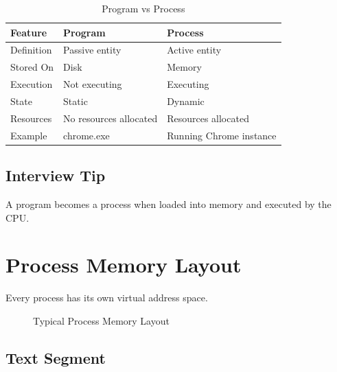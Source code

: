 \begin{table}[H]
\centering
\begin{tabular}{|p{4cm}|p{5.5cm}|p{5.5cm}|}
\hline
Feature & Program & Process \\
\hline
Definition & Passive entity & Active entity \\
\hline
Stored On & Disk & Memory \\
\hline
Execution & Not executing & Executing \\
\hline
State & Static & Dynamic \\
\hline
Resources & No resources allocated & Resources allocated \\
\hline
Example & chrome.exe & Running Chrome instance \\
\hline
\end{tabular}
\caption{Program vs Process}
\end{table}

\subsection{Interview Tip}

A program becomes a process when loaded into memory and executed by the CPU.

\section{Process Memory Layout}

Every process has its own virtual address space.

\begin{figure}[H]
\centering
{}
\caption{Typical Process Memory Layout}
\end{figure}

\subsection{Text Segment}

